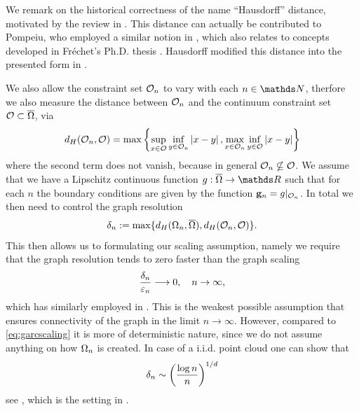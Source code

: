 \begin{remark}{}{}
We remark on the historical correctness of the name \enquote{Hausdorff} distance, motivated by the review in \cite{birsan2006one}. This distance can actually be contributed to Pompeiu, who employed a similar notion in \cite{pompeiu1905continuite}, which also relates to concepts developed in Fréchet's Ph.D. thesis \cite{frechet1906quelques}. Hausdorff modified this distance into the presented form in \cite{hausdorff1914}.
\end{remark}
%
%
\noindent%
We also allow the constraint set $\mathcal{O}_n$ to vary with each $n\in\N$, therfore we also measure the distance between $\mathcal{O}_n$ and the continuum constraint set $\mathcal{O}\subset\overline{\Omega}$, via
%
\begin{align*}
d_H(\mathcal{O}_n, \mathcal{O}) = 
\max
\left\{
\sup_{x\in\mathcal{O}} \inf_{y\in\mathcal{O}_n} \left|x-y\right|,  
\max_{x\in\mathcal{O}_n} \inf_{y\in\mathcal{O}} \left|x-y\right|
\right\}
\end{align*}
%
where the second term does not vanish, because in general $\mathcal{O}_n\nsubseteq\mathcal{O}$. We assume that we have a Lipschitz continuous function $g:\cl\domain\to\R$ such that for each $n$ the boundary conditions are given by the function $\mathbf{g}_n = g\rvert_{\mathcal{O}_n}$. In total we then need to control the graph resolution 
%
\begin{align*}
\delta_n := \max\{d_H(\Omega_n, \overline{\Omega}), d_H(\mathcal{O}_n, \mathcal{O})\}.
\end{align*}
%
This then allows us to formulating our scaling assumption, namely we require that the graph resolution tends to zero faster than the graph scaling
%
\begin{align}\label{eq:scaling}
\frac{\delta_n}{\varepsilon_n}\longrightarrow 0, \quad n \to \infty,
\end{align}
%
which has similarly employed in \cite{penrose1999strong,penrose1999strong2}. This is the weakest possible assumption that ensures connectivity of the graph in the limit $n\to\infty$. However, compared to \cref{eq:garcscaling} it is more of deterministic nature, since we do not assume anything on how $\Omega_n$ is created. In case of a i.i.d. point cloud one can show that
%
\begin{align*}
\delta_n \sim \left(\frac{\log n}{n}\right)^{1/d}
\end{align*}
%
see \cite{penrose1999strong2}, which is the setting in \cite{GarcSlep15}.
%
%
